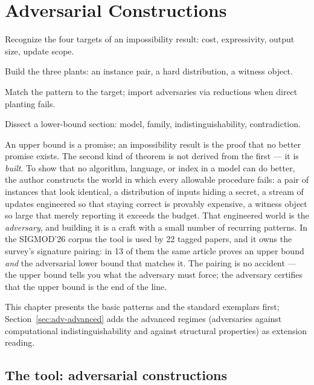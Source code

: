 \chapter{Adversarial Constructions}
\setcounter{section}{-1}   %
\label{ch:adv}

\begin{objectives}
\item Recognize the four targets of an impossibility result: cost, expressivity, output size, update scope.
\item Build the three plants: an instance pair, a hard distribution, a witness object.
\item Match the pattern to the target; import adversaries via reductions when direct planting fails.
\item Dissect a lower-bound section: model, family, indistinguishability, contradiction.
\end{objectives}

An upper bound is a promise; an impossibility result is the proof that no better promise exists.
The second kind of theorem is not derived from the first --- it is \emph{built}. To show that no
algorithm, language, or index in a model can do better, the author constructs the world in which
every allowable procedure fails: a pair of instances that look identical, a distribution of
inputs hiding a secret, a stream of updates engineered so that staying correct is provably
expensive, a witness object so large that merely reporting it exceeds the budget. That engineered
world is the \emph{adversary}, and building it is a craft with a small number of recurring
patterns. In the SIGMOD'26 corpus the tool is used by 22 tagged papers, and it owns the survey's
signature pairing: in 13 of them the same article proves an upper bound \emph{and} the
adversarial lower bound that matches it. The pairing is no accident --- the upper bound tells you
what the adversary must force; the adversary certifies that the upper bound is the end of the
line.

This chapter presents the basic patterns and the standard exemplars first;
Section~\ref{sec:adv-advanced} adds the advanced regimes (adversaries against computational
indistinguishability and against structural properties) as extension reading.

\section{The tool: adversarial constructions}
\label{sec:adv-tool}

